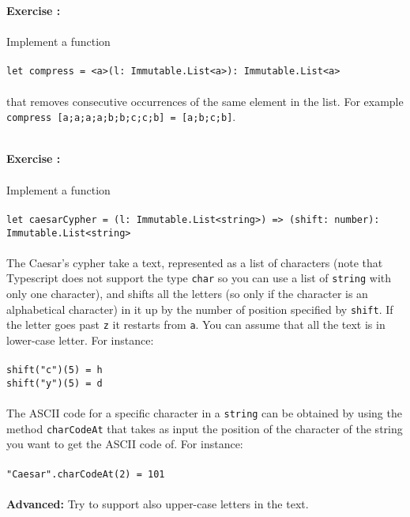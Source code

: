 \documentclass[]{article}
\newcounter{ExerciseCount}
\newcommand{\functionEx}[3]{
  Implement a function\\\\
   \texttt{let #1 = #2}\\\\ #3
}
\newcommand{\exercise}[1]{\noindent \textbf{Exercise \theExerciseCount:}\\\\ #1 \addtocounter{ExerciseCount}{1}
}
\begin{document}
\exercise{
  \functionEx{compress}{<a>(l: Immutable.List<a>): Immutable.List<a>}{
    that removes consecutive occurrences of the same element in the list. For example \texttt{compress [a;a;a;a;b;b;c;c;b] = [a;b;c;b]}.
  }
}\\

\exercise{
  \functionEx{caesarCypher}{(l: Immutable.List<string>) => (shift: number):\\ Immutable.List<string>}{
    The Caesar's cypher take a text, represented as a list of characters (note that Typescript does not support the type \texttt{char} so you can use a list of \texttt{string} with only one character), and shifts all the letters (so only if the character is an alphabetical character) in it up by the number of position specified by \texttt{shift}. If the letter goes past \texttt{z} it restarts from \texttt{a}. You can assume that all the text is in lower-case letter. For instance:\\\\    
    \texttt{shift("c")(5) = h}\\
    \texttt{shift("y")(5) = d}\\\\
    The ASCII code for a specific character in a \texttt{string} can be obtained by using the method \texttt{charCodeAt} that takes as input the position of the character of the string you want to get the ASCII code of. For instance:\\\\
    \texttt{"Caesar".charCodeAt(2) = 101}\\\\
    \textbf{Advanced: } Try to support also upper-case letters in the text.
  }
}\\
\end{document}
